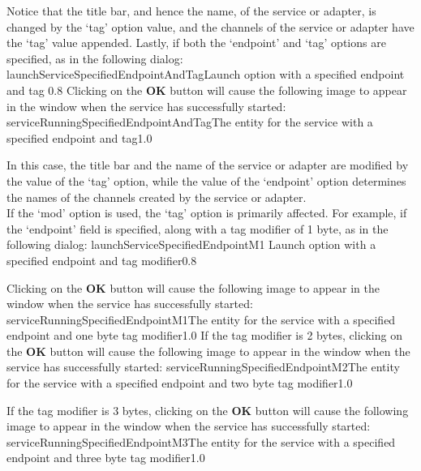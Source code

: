 Notice that the title bar, and hence the name, of the service or adapter, is changed by
the `tag' option value, and the channels of the service or adapter have the `tag' value
appended.
Lastly, if both the `endpoint' and `tag' options are specified, as in the following
dialog:
%
{launchServiceSpecifiedEndpointAndTag}{Launch option with a specified endpoint and tag}%
{0.8}
\condPage{}
Clicking on the \textbf{OK} button will cause the following image to appear in the
\emph{\MMMU} window when the service has successfully started:
%
{serviceRunningSpecifiedEndpointAndTag}{The \emph{\MMMU} entity for the service with a
specified endpoint and tag}{1.0}

In this case, the title bar and the name of the service or adapter are modified by the
value of the `tag' option, while the value of the `endpoint' option determines the names
of the \yarp{} channels created by the service or adapter.\\

If the `mod' option is used, the `tag' option is primarily affected.
For example, if the `endpoint' field is specified, along with a tag modifier of 1 byte, as
in the following dialog:
%
{launchServiceSpecifiedEndpointM1}%
{Launch option with a specified endpoint and tag modifier}{0.8}

Clicking on the \textbf{OK} button will cause the following image to appear in the
\emph{\MMMU} window when the service has successfully started:
%
{serviceRunningSpecifiedEndpointM1}{The \emph{\MMMU} entity for the service with a
specified endpoint and one byte tag modifier}{1.0}
\condPage{}
If the tag modifier is 2 bytes, clicking on the \textbf{OK} button will cause the
following image to appear in the \emph{\MMMU} window when the service has successfully
started:
%
{serviceRunningSpecifiedEndpointM2}{The \emph{\MMMU} entity for the service with a
specified endpoint and two byte tag modifier}{1.0}

If the tag modifier is 3 bytes, clicking on the \textbf{OK} button will cause the
following image to appear in the \emph{\MMMU} window when the service has successfully
started:
%
{serviceRunningSpecifiedEndpointM3}{The \emph{\MMMU} entity for the service with a
specified endpoint and three byte tag modifier}{1.0}

